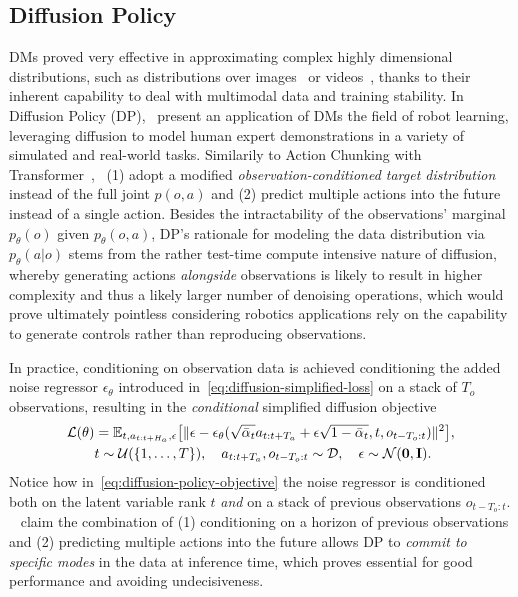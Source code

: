 \subsection{Diffusion Policy}
DMs proved very effective in approximating complex highly dimensional distributions, such as distributions over images~\citep{hoDenoisingDiffusionProbabilistic2020} or videos~\citep{polyakMovieGenCast2025}, thanks to their inherent capability to deal with multimodal data and training stability.
In Diffusion Policy (DP),~\citet{chiDiffusionPolicyVisuomotor2024} present an application of DMs the field of robot learning, leveraging diffusion to model human expert demonstrations in a variety of simulated and real-world tasks.
Similarily to Action Chunking with Transformer~\citep{zhaoLearningFineGrainedBimanual2023},~\citet{chiDiffusionPolicyVisuomotor2024} (1) adopt a modified \emph{observation-conditioned target distribution} instead of the full joint \( p(o,a) \) and (2) predict multiple actions into the future instead of a single action.
Besides the intractability of the observations' marginal \( p_\theta(o) \) given \(p_\theta(o,a) \), DP's rationale for modeling the data distribution via \( p_\theta(a \vert o) \) stems from the rather test-time compute intensive nature of diffusion, whereby generating actions \emph{alongside} observations is likely to result in higher complexity and thus a likely larger number of denoising operations, which would prove ultimately pointless considering robotics applications rely on the capability to generate controls rather than reproducing observations.

In practice, conditioning on observation data is achieved conditioning the added noise regressor \( \epsilon_\theta \) introduced in~\ref{eq:diffusion-simplified-loss} on a stack of \( T_o \) observations, resulting in the \emph{conditional} simplified diffusion objective
\begin{align}
    \mathcal L(\theta) &= \mathbb{E}_{t, a_{t:t+H_a}, \epsilon} \big[
        \Vert \epsilon - \epsilon_\theta(\sqrt{\bar \alpha_t} a_{t:t+T_a} + \epsilon \sqrt{1 - \bar \alpha_t}, t, o_{t-T_o:t}) \Vert^2 \big], \label{eq:diffusion-policy-objective} \\
        & t \sim \mathcal{U}(\{1,\dots,T\}), \quad
        a_{t:t+T_a}, o_{t-T_o:t} \sim \mathcal{D}, \quad
        \epsilon \sim \mathcal{N}(\mathbf{0},\mathbf{I}). \notag 
\end{align}
Notice how in~\ref{eq:diffusion-policy-objective} the noise regressor is conditioned both on the latent variable rank \( t \) \emph{and} on a stack of previous observations \(o_{t-T_o:t} \).
~\citet{chiDiffusionPolicyVisuomotor2024} claim the combination of (1) conditioning on a horizon of previous observations and (2) predicting multiple actions into the future allows DP to \emph{commit to specific modes} in the data at inference time, which proves essential for good performance and avoiding undecisiveness.

